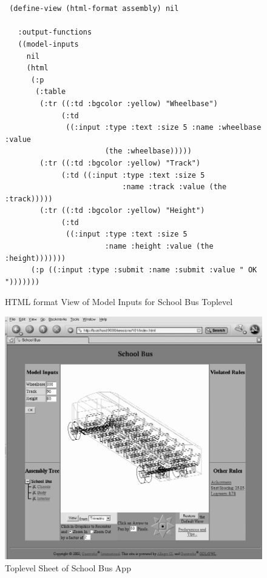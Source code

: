 \documentclass [11pt]{book}
\begin{document}
\begin{figure}
\begin{lrbox}{\boxedverb}
\begin{minipage}{\linewidth}

\begin{verbatim}


 (define-view (html-format assembly) nil
  
   :output-functions
   ((model-inputs
     nil
     (html 
      (:p
       (:table
        (:tr ((:td :bgcolor :yellow) "Wheelbase")
             (:td
              ((:input :type :text :size 5 :name :wheelbase :value
                       (the :wheelbase)))))
        (:tr ((:td :bgcolor :yellow) "Track")
             (:td ((:input :type :text :size 5 
                           :name :track :value (the :track)))))
        (:tr ((:td :bgcolor :yellow) "Height")
             (:td
              ((:input :type :text :size 5 
                       :name :height :value (the :height)))))))
      (:p ((:input :type :submit :name :submit :value " OK ")))))))

\end{verbatim}
\end{minipage}
\end{lrbox}
\fbox{\usebox{\boxedverb}}

\caption{HTML format View of Model Inputs for School Bus Toplevel}

\label{code:school-bus-model-inputs}

\end{figure}

\begin{figure}
\begin{center}
\includegraphics{../images/school-bus.png}
\end{center}

\caption{Toplevel Sheet of School Bus App}

\label{fig:school-bus}

\end{figure}
\end{document}

